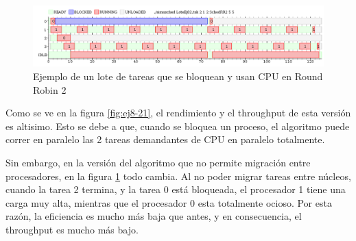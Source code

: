 \begin{figure}[H]
\caption{Ejemplo de un lote de tareas que se bloquean y usan CPU en Round Robin 2}
\label{fig:ej8-22}
\includegraphics[width=1\textwidth]{imgs/ej8-2rr2.png}
\end{figure}


Como se ve en la figura \ref{fig:ej8-21}, el rendimiento y el throughput de esta versión es altisimo. Esto se debe a que, cuando se bloquea un proceso, el algoritmo puede correr en paralelo las 2 tareas demandantes de CPU en paralelo totalmente.

Sin embargo, en la versión del algoritmo que no permite migración entre procesadores, en la figura \ref{fig:ej8-22} todo cambia. Al no poder migrar tareas entre núcleos, cuando la tarea 2 termina, y la tarea 0 está bloqueada, el procesador 1 tiene una carga muy alta, mientras que el procesador 0 esta totalmente ocioso. Por esta razón, la eficiencia es mucho más baja que antes, y en consecuencia, el throughput es mucho más bajo.



